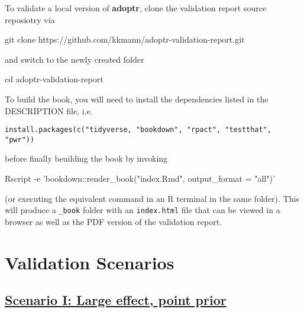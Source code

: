 \documentclass[]{book}
\newenvironment{Shaded}{\begin{snugshade}}{\end{snugshade}}
\newcommand{\BuiltInTok}[1]{#1}
\newcommand{\ExtensionTok}[1]{#1}
\newcommand{\FunctionTok}[1]{\textcolor[rgb]{0.00,0.00,0.00}{#1}}
\newcommand{\NormalTok}[1]{#1}
\newcommand{\StringTok}[1]{\textcolor[rgb]{0.31,0.60,0.02}{#1}}
\begin{document}
To validate a local version of \textbf{adoptr}, clone the validation report
source reposiotry via

\begin{Shaded}
\begin{Highlighting}[]
\FunctionTok{git}\NormalTok{ clone https://github.com/kkmann/adoptr-validation-report.git}
\end{Highlighting}
\end{Shaded}

and switch to the newly created folder

\begin{Shaded}
\begin{Highlighting}[]
\BuiltInTok{cd}\NormalTok{ adoptr-validation-report}
\end{Highlighting}
\end{Shaded}

To build the book, you will need to install the dependencies listed in the DESCRIPTION file,
i.e.

\begin{verbatim}
install.packages(c("tidyverse, "bookdown", "rpact", "testthat", "pwr"))
\end{verbatim}

before finally beuilding the book by invoking

\begin{Shaded}
\begin{Highlighting}[]
\ExtensionTok{Rscript}\NormalTok{ -e }\StringTok{'bookdown::render_book("index.Rmd", output_format = "all")'}
\end{Highlighting}
\end{Shaded}

(or executing the equivalent command in an R terminal in the same folder).
This will produce a \texttt{\_book} folder with an \texttt{index.html} file that can be
viewed in a browser as well as the PDF version of the validation
report.

\hypertarget{validation-scenarios}{%
\section{Validation Scenarios}\label{validation-scenarios}}

\hypertarget{scenario-i-large-effect-point-prior}{%
\subsection{\texorpdfstring{\protect\hyperlink{scenarioI}{Scenario I: Large effect, point prior}}{Scenario I: Large effect, point prior}}\label{scenario-i-large-effect-point-prior}}
\end{document}
